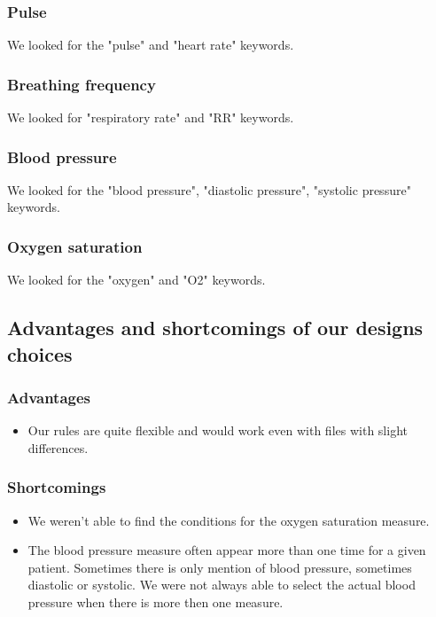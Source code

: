 \documentclass{eplDoc}
\begin{document}
\subsubsection{Pulse}

We looked for the "pulse" and "heart rate" keywords. 

\subsubsection{Breathing frequency}

We looked for "respiratory rate" and "RR" keywords. 

\subsubsection{Blood pressure}

We looked for the "blood pressure", "diastolic pressure", "systolic pressure" keywords.

\subsubsection{Oxygen saturation}

We looked for the "oxygen" and "O2" keywords. 



\subsection{Advantages and shortcomings of our designs choices}
\subsubsection{Advantages}
\begin{itemize}
	\item Our rules are quite flexible and would work even with files with slight differences.
\end{itemize}
\subsubsection{Shortcomings}
\begin{itemize}
	\item We weren't able to find the conditions for the oxygen saturation measure. 
	\item The blood pressure measure  often appear more than one time for a given patient. Sometimes there is only mention of blood pressure, sometimes diastolic or systolic. We were not always able to select the actual blood pressure when there is more then one measure. 
\end{itemize}




\end{document}
